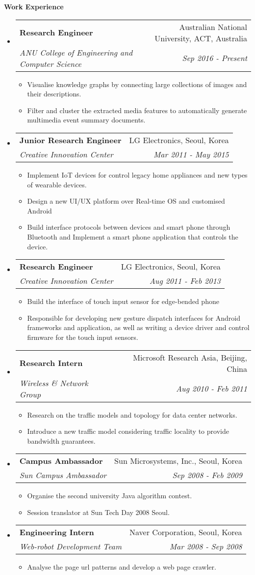 \documentclass[letterpaper,11pt]{article}
\makeatletter
\newcommand{\resitem}[1]{\item #1 \vspace{-2pt}}
\newcommand{\resheading}[1]{{\large \colorbox{mygrey}{\begin{minipage}{\textwidth}{\textbf{#1 \vphantom{p\^{E}}}}\end{minipage}}}}
\newcommand{\ressubheading}[4]{
\begin{tabular*}{7.0in}{l@{\extracolsep{\fill}}r}
		\textbf{#1} & #2 \\
		\textit{#3} & \textit{#4} \\
\end{tabular*}\vspace{-6pt}}
\makeatother
\begin{document}
\resheading{Work Experience}
\begin{itemize}
\item
	\ressubheading{Research Engineer}{Australian National University, ACT, Australia}{ANU College of Engineering and Computer Science}{Sep 2016 - Present}
	\begin{itemize}
		\resitem{Visualise knowledge graphs by connecting large collections of images and their descriptions.}
		\resitem{Filter and cluster the extracted media features to automatically generate multimedia event summary documents.}
	\end{itemize}
	
\item
	\ressubheading{Junior Research Engineer}{LG Electronics, Seoul, Korea}{Creative Innovation Center}{Mar 2011 - May 2015}
	\begin{itemize}
		\resitem{Implement IoT devices for control legacy home appliances and new types of wearable devices.}
		\resitem{Design a new UI/UX platform over Real-time OS and customised Android}
		\resitem{Build interface protocols between devices and smart phone through Bluetooth and Implement a smart phone application that controls the device.}
	\end{itemize}
\item
	\ressubheading{Research Engineer}{LG Electronics, Seoul, Korea}{Creative Innovation Center}{Aug 2011 - Feb 2013}
	\begin{itemize}
		\resitem{Build the interface of touch input sensor for edge-bended phone}
		\resitem{Responsible for developing new gesture dispatch interfaces for Android frameworks and application, as well as writing a device driver and control firmware for the touch input sensors.}
	\end{itemize}

\item
	\ressubheading{Research Intern}{Microsoft Research Asia, Beijing, China}{Wireless \& Network Group}{Aug 2010 - Feb 2011}
	\begin{itemize}
		\resitem{Research on the traffic models and topology for data center networks.}
        \resitem{Introduce a new traffic model considering traffic locality to provide bandwidth guarantees.}
	\end{itemize}

\item
	\ressubheading{Campus Ambassador}{Sun Microsystems, Inc., Seoul, Korea}{Sun Campus Ambassador}{Sep 2008 - Feb 2009}
	\begin{itemize}
		\resitem{Organise the second university Java algorithm contest.}
        \resitem{Session translator at Sun Tech Day 2008 Seoul.}
	\end{itemize}

\item
	\ressubheading{Engineering Intern}{Naver Corporation, Seoul, Korea}{Web-robot Development Team}{Mar 2008 - Sep 2008}
	\begin{itemize}
		\resitem{Analyse the page url patterns and develop a web page crawler.}
	\end{itemize}

\end{itemize}
\end{document}
